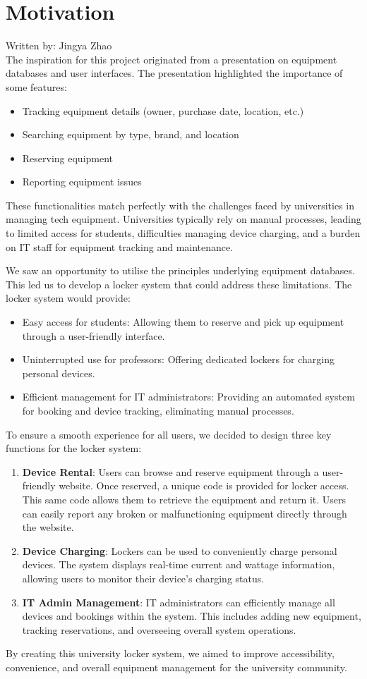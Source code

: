 \section{Motivation}
{\tiny Written by: Jingya Zhao}\\

The inspiration for this project originated from a presentation on equipment databases and user interfaces. The presentation highlighted the importance of some features:
\begin{itemize}
    \item Tracking equipment details (owner, purchase date, location, etc.)
    \item Searching equipment by type, brand, and location
    \item Reserving equipment
    \item Reporting equipment issues
\end{itemize}

These functionalities match perfectly with the challenges faced by universities in managing tech equipment. Universities typically rely on manual processes, leading to limited access for students, difficulties managing device charging, and a burden on IT staff for equipment tracking and maintenance.

We saw an opportunity to utilise the principles underlying equipment databases. This led us to develop a locker system that could address these limitations. The locker system would provide:
\begin{itemize}
    \item Easy access for students: Allowing them to reserve and pick up equipment through a user-friendly interface.
    \item Uninterrupted use for professors: Offering dedicated lockers for charging personal devices.
    \item Efficient management for IT administrators: Providing an automated system for booking and device tracking, eliminating manual processes.
\end{itemize}

To ensure a smooth experience for all users, we decided to design three key functions for the locker system:

\begin{enumerate}
    \item \textbf{Device Rental}: Users can browse and reserve equipment through a user-friendly website. Once reserved, a unique code is provided for locker access. This same code allows them to retrieve the equipment and return it. Users can easily report any broken or malfunctioning equipment directly through the website.
    \item \textbf{Device Charging}: Lockers can be used to conveniently charge personal devices. The system displays real-time current and wattage information, allowing users to monitor their device's charging status.
    \item \textbf{IT Admin Management}: IT administrators can efficiently manage all devices and bookings within the system. This includes adding new equipment, tracking reservations, and overseeing overall system operations.
\end{enumerate}

By creating this university locker system, we aimed to improve accessibility, convenience, and overall equipment management for the university community.
